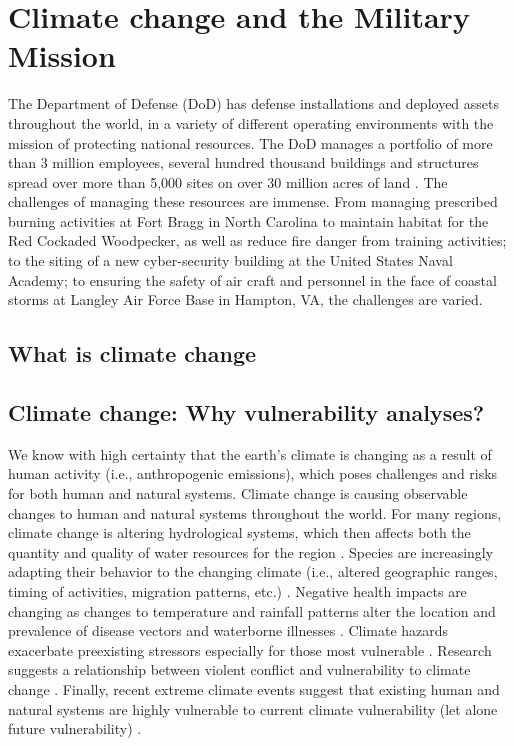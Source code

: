 \documentclass[10pt]{amsart}
\begin{document}
\section{Climate change and the Military Mission}
The Department of Defense (DoD) has defense installations and deployed assets throughout the world, in a variety of different operating environments with the mission of protecting national resources.
The DoD manages a portfolio of more than 3 million employees, several hundred thousand buildings and structures spread over more than 5,000 sites on over 30 million acres of land \parencite{dodassets2016}.
The challenges of managing these resources are immense.
From managing prescribed burning activities at Fort Bragg in North Carolina to maintain habitat for the Red Cockaded Woodpecker, as well as reduce fire danger from training activities; to the siting of a new cyber-security building at the United States Naval Academy; to ensuring the safety of air craft and personnel in the face of coastal storms at Langley Air Force Base in Hampton, VA, the challenges are varied.

\subsection{What is climate change}


\subsection{Climate change: Why vulnerability analyses?}
We know with high certainty that the earth's climate is changing as a result of human activity (i.e., anthropogenic emissions), which poses challenges and risks for both human and natural systems.
Climate change is causing observable changes to human and natural systems throughout the world.
For many regions, climate change is altering hydrological systems, which then affects both the quantity and quality of water resources for the region \parencite{field2014summary}.
Species are increasingly adapting their behavior to the changing climate (i.e., altered geographic ranges, timing of activities, migration patterns, etc.) \parencite{field2014summary}.
Negative health impacts are changing as changes to temperature and rainfall patterns alter the location and prevalence of disease vectors and waterborne illnesses \parencite{field2014summary}.
Climate hazards exacerbate preexisting stressors especially for those most vulnerable \parencite{field2014summary}.
Research suggests a relationship between violent conflict and vulnerability to climate change \parencite{field2014summary}.
Finally, recent extreme climate events suggest that existing human and natural systems are highly vulnerable to current climate vulnerability (let alone future vulnerability) \parencite{field2014summary}.
\end{document}
